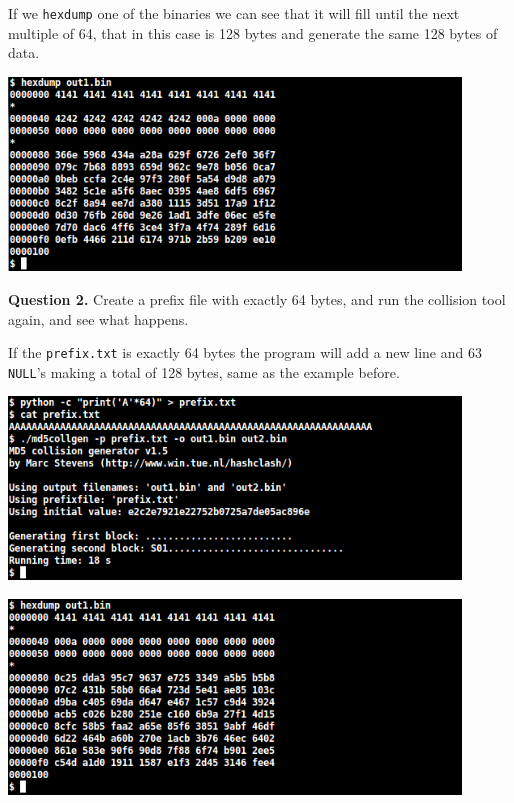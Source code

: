 \documentclass[a4paper]{article}
\begin{document}
\bigskip

If we \texttt{hexdump} one of the binaries we can see that it will fill until the next multiple of 64, that in this case is 128 bytes and generate the same 128 bytes of data.

\bigskip

\includegraphics[width=0.9\textwidth]{bash/md5collgenoutdumpAB.png}

\newpage

\textbf{Question 2.} Create a prefix file with exactly 64 bytes, and run the collision tool again, and see what happens.

\bigskip

If the \texttt{prefix.txt} is exactly 64 bytes the program will add a new line and 63 \texttt{NULL}'s making a total of 128 bytes, same as the example before.

\bigskip

\includegraphics[width=0.9\textwidth]{bash/md5collgenout64.png}

\bigskip

\includegraphics[width=0.9\textwidth]{bash/md5collgenoutdump64.png}
\end{document}
